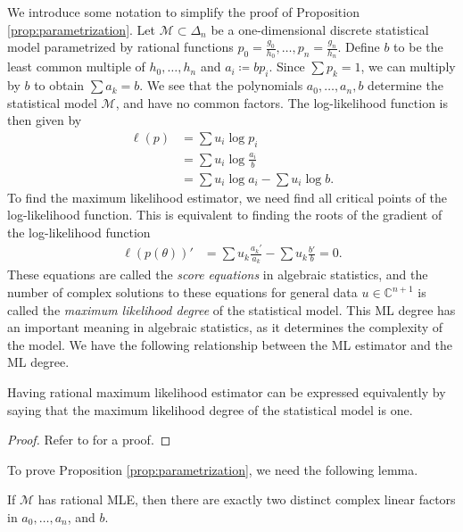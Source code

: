 We introduce some notation to simplify the proof of Proposition \ref{prop:parametrization}.
Let \( \mathcal{M} \subset \Delta_n \) be a one-dimensional discrete statistical model parametrized by rational functions \( p_0 =  \frac{g_0}{h_0}, \dots, p_n =  \frac{g_n}{h_n} \). Define \( b \) to be the least common multiple of \( h_0, \dots, h_n \) and \( a_i \coloneqq b p_i \). Since \( \sum p_k = 1 \), we can multiply by \( b \) to obtain \( \sum a_k = b \). We see that the polynomials \( a_0, \dots, a_n, b \) determine the statistical model \( \mathcal{M} \), and have no common factors. The log-likelihood function is then given by
\begin{align*}
    \ell(p) &= \sum u_i \log p_i \\
    &= \sum u_i \log \frac{a_i}{b} \\
    &= \sum u_i \log a_i - \sum u_i \log b.
\end{align*}
To find the maximum likelihood estimator, we need find all critical points of the log-likelihood function. This is equivalent to finding the roots of the gradient of the log-likelihood function
\begin{align}\label{eq:score-equations}
    \ell(p(\theta))' &= \sum u_k \frac{a_k'}{a_k} - \sum u_k \frac{b'}{b} = 0.
\end{align}
These equations are called the \emph{score equations} in algebraic statistics, and the number of complex solutions to these equations for general data \( u \in \mathbb{C}^{n + 1} \) is called the \emph{maximum likelihood degree} of the statistical model. This ML degree has an important meaning in algebraic statistics, as it determines the complexity of the model. We have the following relationship between the ML estimator and the ML degree.

\begin{proposition}\label{prop:rational-mle}
    Having rational maximum likelihood estimator can be expressed equivalently by saying that the maximum likelihood degree of the statistical model is one.
\end{proposition}

\begin{proof}
   Refer to \cite{duarte2021discrete} for a proof.
\end{proof}

To prove Proposition \ref{prop:parametrization}, we need the following lemma.

\begin{lemma}\label{lem:two-complex-factors}
    If \( \mathcal{M} \) has rational MLE, then there are exactly two distinct complex linear factors in \( a_0, \dots, a_n \), and \( b \).
\end{lemma}

